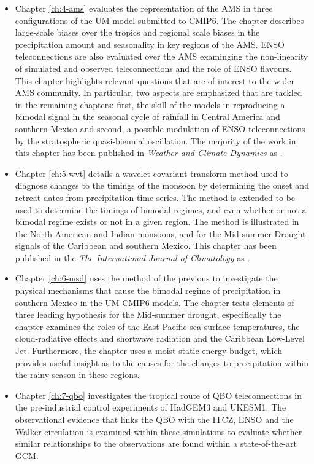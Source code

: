 \begin{itemize}
\item Chapter \ref{ch:4-ams} evaluates the representation of the AMS  in three configurations of the UM model submitted to CMIP6. The chapter describes large-scale biases over the tropics and regional scale biases in the precipitation amount and seasonality in key regions of the AMS. 
ENSO teleconnections are also evaluated over the AMS examinging the non-linearity of simulated and observed teleconnections and the role of ENSO flavours. This chapter highlights relevant questions that are of interest to the wider AMS community. In particular, two aspects are emphasized that are tackled in the remaining chapters: first, the skill of the models in reproducing a bimodal signal in the seasonal cycle of rainfall in Central America and southern Mexico and second, a possible modulation of ENSO teleconnections by the stratospheric quasi-biennial oscillation.
The majority of the work in this chapter has been published in \textit{Weather and Climate Dynamics} as \cite{garciafranco2020}.
\item Chapter \ref{ch:5-wvt} details a wavelet covariant transform method used to diagnose changes to the timings of the monsoon by determining the onset and retreat dates from precipitation time-series. The method is extended to be used to determine the timings of bimodal regimes, and even whether or not a bimodal regime exists or not in a given region. The method is illustrated in the North American and Indian monsoons, and for the Mid-summer Drought signals of the Caribbean and southern Mexico. This chapter has been published in the \textit{The International Journal of Climatology} as \cite{garciafranco2021}.
\item Chapter \ref{ch:6-msd} uses the method of the previous to investigate the physical mechanisms that cause the bimodal regime of precipitation in southern Mexico in the UM CMIP6 models. The chapter tests elements of three leading hypothesis for the Mid-summer drought, especifically the chapter examines the roles of the East Pacific sea-surface temperatures, the cloud-radiative effects and shortwave radiation and the Caribbean Low-Level Jet. Furthermore, the chapter uses a moist static energy budget, which provides useful insight as to the causes for the changes to precipitation within the rainy season in these regions.
\item Chapter \ref{ch:7-qbo} investigates the tropical route of QBO teleconnections in the pre-industrial control experiments of HadGEM3 and UKESM1.
The observational evidence that links the QBO with the ITCZ, ENSO and the Walker circulation is examined within these simulations to evaluate whether similar relationships to the observations are found within a state-of-the-art GCM. 

\end{itemize}
